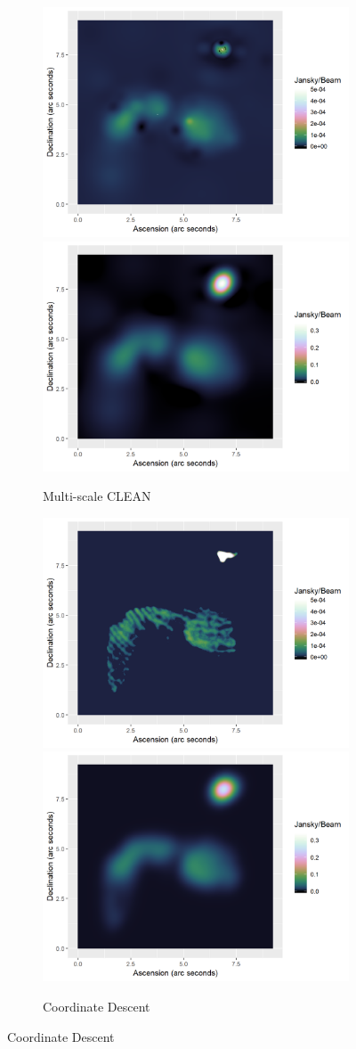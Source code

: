 \begin{figure}[!ht]
	\centering
	\begin{subfigure}[b]{1.0\linewidth}
		\centering
		\includegraphics[width=0.45\linewidth]{./chapters/10.results/MSClean/Natural-Calibration.png}
		\includegraphics[width=0.45\linewidth]{./chapters/10.results/MSClean/Natural-image-Calibration.png}
		\caption{Multi-scale CLEAN}
	\end{subfigure}
	\begin{subfigure}[b]{1.0\linewidth}
		\centering
		\includegraphics[width=0.45\linewidth]{./chapters/10.results/SerialCD/CD-Calibration.png}
		\includegraphics[width=0.45\linewidth]{./chapters/10.results/SerialCD/CD-image-Calibration.png}
		\caption{Coordinate Descent}

\end{subfigure}
\end{figure}
